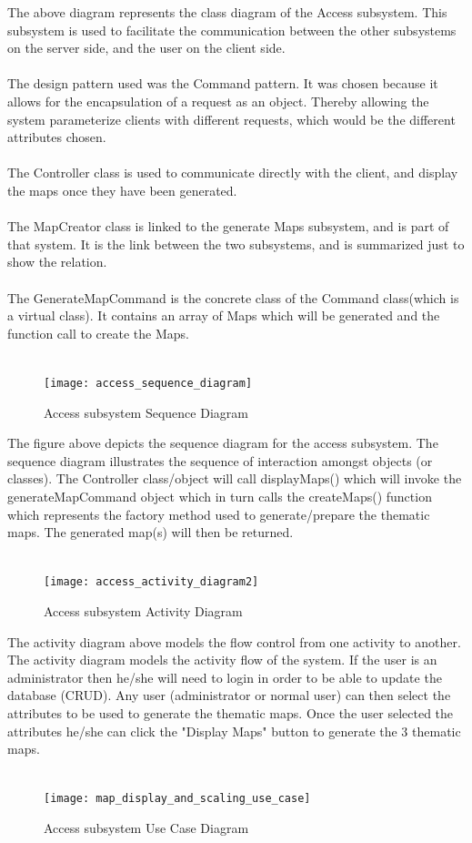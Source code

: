 \documentclass{article}
\begin{document}
The above diagram represents the class diagram of the Access subsystem. This subsystem is used to facilitate the communication between the other subsystems on the server side, and the user on the client side.\\\\
        The design pattern used was the Command pattern. It was chosen because it allows for the encapsulation of a request as an object. Thereby allowing the system parameterize clients with different requests, which would be the different attributes chosen.
        \\\\
        The Controller class is used to communicate directly with the client, and display the maps once they have been generated.
        \\\\
        The MapCreator class is linked to the generate Maps subsystem, and is part of that system. It is the link between the two subsystems, and is summarized just to show the relation.
        \\\\
        The GenerateMapCommand is the concrete class of the Command class(which is a virtual class). It contains an array of Maps which will be generated and the function call to create the Maps.
        \\\\
     
     
       \begin{figure}[h!]
        \texttt{[image: access\_sequence\_diagram]}
            \caption{Access subsystem Sequence Diagram}
        \end{figure}
        
The figure above depicts the sequence diagram for the access subsystem. The sequence diagram illustrates the sequence of interaction amongst objects (or classes). The Controller class/object will call displayMaps() which will invoke the generateMapCommand object which in turn calls the createMaps() function which represents the factory method used to generate/prepare the thematic maps. The generated map(s) will then be returned.          
 \\\\
     \newpage
     \begin{figure}[h!]
       \texttt{[image: access\_activity\_diagram2]}
       \caption{Access subsystem Activity Diagram}
       \end{figure}
       \newpage
The activity diagram above models the flow control from one activity to another. The activity diagram models the activity flow of the system. If the user is an administrator then he/she will need to login in order to be able to update the database (CRUD). Any user (administrator or normal user) can then select the attributes to be used to generate the thematic maps. Once the user selected the attributes he/she can click the "Display Maps" button to generate the 3 thematic maps.  
\\\\      
		\begin{figure}[h!]
       \texttt{[image: map\_display\_and\_scaling\_use\_case]}
       \caption{Access subsystem Use Case Diagram}
       \end{figure}
       \newpage
\end{document}
